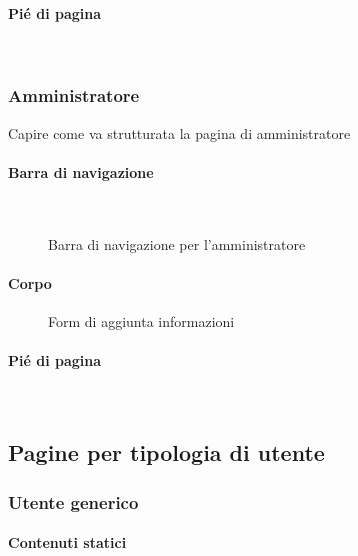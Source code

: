 \paragraph{Pié di pagina}
~\\

\begin{figure}[h!]
	\label{fig:footer}
\end{figure}
\subsubsection{Amministratore}
Capire come va strutturata la pagina di amministratore 
\paragraph{Barra di navigazione}
~\\

\begin{figure}[h!]
	\caption{Barra di navigazione per l'amministratore}
	\label{fig:navbarAD}
\end{figure}
\paragraph{Corpo}
\begin{figure}[h!]
	\caption{Form di aggiunta informazioni}
	\label{fig:addForm}
\end{figure}

\paragraph{Pié di pagina}
~\\
\subsection{Pagine per tipologia di utente}

\subsubsection{Utente generico}
\paragraph{Contenuti statici}

